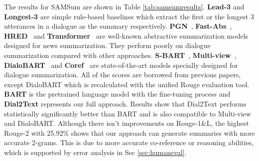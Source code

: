 The results for SAMSum are shown in Table \ref{tab:samsumresults}. \textbf{Lead-3} and \textbf{Longest-3} are simple rule-based baselines which extract the first or the longest $3$ utterances in a dialogue as the summary respectively. \textbf{PGN}~\cite{see2017get}, \textbf{Fast-Abs}~\cite{chen2018fast}, \textbf{HRED}~\cite{serban2016building} and \textbf{Transformer}~\cite{vaswani2017attention} are well-known abstractive summarization models designed for news summarization. 
They perform poorly on dialogue summarization compared with other approaches.
\textbf{S-BART}~\cite{chen2021structure}, \textbf{Multi-view}~\cite{chen2020multi}, \textbf{DialoBART}~\cite{feng2021language} and \textbf{Coref}~\cite{liu2021coreference} are state-of-the-art models specially designed for dialogue summarization. All of the scores are borrowed from previous papers, except DialoBART which is recalculated with the unified Rouge evaluation tool. \textbf{BART} is the pretrained language model with the fine-tuning process and \textbf{Dial2Text} represents our full approach. 
Results show that Dial2Text performs statistically significantly better than BART and is also compatible to Multi-view and DialoBART. Although there isn't improvements on Rouge-1\&L, the highest Rouge-2 with 25.92\% shows that our approach can generate summaries with more accurate 2-grams. This is due to more accurate co-reference or reasoning abilities, which is supported by error analysis in Sec \ref{sec:humaneval}.

